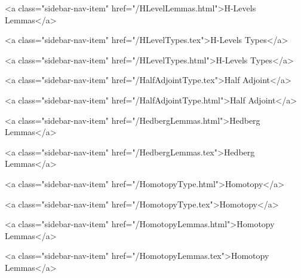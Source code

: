       
        
          <a class="sidebar-nav-item" href="/HLevelLemmas.html">H-Levels Lemmas</a>
        
      
    
      
        
          <a class="sidebar-nav-item" href="/HLevelTypes.tex">H-Levels Types</a>
        
      
    
      
        
          <a class="sidebar-nav-item" href="/HLevelTypes.html">H-Levels Types</a>
        
      
    
      
        
          <a class="sidebar-nav-item" href="/HalfAdjointType.tex">Half Adjoint</a>
        
      
    
      
        
          <a class="sidebar-nav-item" href="/HalfAdjointType.html">Half Adjoint</a>
        
      
    
      
        
          <a class="sidebar-nav-item" href="/HedbergLemmas.html">Hedberg Lemmas</a>
        
      
    
      
        
          <a class="sidebar-nav-item" href="/HedbergLemmas.tex">Hedberg Lemmas</a>
        
      
    
      
        
          <a class="sidebar-nav-item" href="/HomotopyType.html">Homotopy</a>
        
      
    
      
        
          <a class="sidebar-nav-item" href="/HomotopyType.tex">Homotopy</a>
        
      
    
      
        
          <a class="sidebar-nav-item" href="/HomotopyLemmas.html">Homotopy Lemmas</a>
        
      
    
      
        
          <a class="sidebar-nav-item" href="/HomotopyLemmas.tex">Homotopy Lemmas</a>
        
      
    
